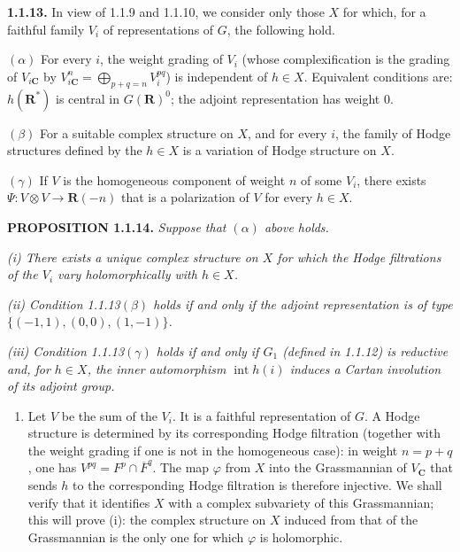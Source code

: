 \documentclass[10pt,a4paper]{article}
\providecommand{\tightlist}{\setlength{\itemsep}{0pt}\setlength{\parskip}{0pt}}
\begin{document}
\textbf{1.1.13.} In view of 1.1.9 and 1.1.10, we consider only those \(X\) for which, for a faithful family \(V_i\) of representations of \(G\), the following hold.

\((\alpha)\) For every \(i\), the weight grading of \(V_i\) (whose complexification is the grading of \(V_{i\mathbf C}\) by \(V_{i\mathbf C}^n=\bigoplus_{p+q=n}V_i^{pq}\)) is independent of \(h\in X\). Equivalent conditions are: \(h(\mathbf R^*)\) is central in \(G(\mathbf R)^0\); the adjoint representation has weight 0.

\((\beta)\) For a suitable complex structure on \(X\), and for every \(i\), the family of Hodge structures defined by the \(h\in X\) is a variation of Hodge structure on \(X\).

\((\gamma)\) If \(V\) is the homogeneous component of weight \(n\) of some \(V_i\), there exists \(\Psi:V\otimes V\to\mathbf R(-n)\) that is a polarization of \(V\) for every \(h\in X\).

\textbf{PROPOSITION 1.1.14.} \emph{Suppose that \((\alpha)\) above holds.}

\emph{(i) There exists a unique complex structure on \(X\) for which the Hodge filtrations of the \(V_i\) vary holomorphically with \(h\in X\).}

\emph{(ii) Condition 1.1.13\((\beta)\) holds if and only if the adjoint representation is of type \(\{(-1,1),(0,0),(1,-1)\}\).}

\emph{(iii) Condition 1.1.13\((\gamma)\) holds if and only if \(G_1\) (defined in 1.1.12) is reductive and, for \(h\in X\), the inner automorphism \(\operatorname{int}h(i)\) induces a Cartan involution of its adjoint group.}

\begin{enumerate}
\def\labelenumi{(\roman{enumi})}
\tightlist
\item
  Let \(V\) be the sum of the \(V_i\). It is a faithful representation of \(G\). A Hodge structure is determined by its corresponding Hodge filtration (together with the weight grading if one is not in the homogeneous case): in weight \(n=p+q\), one has \(V^{pq}=F^p\cap\overline F^q\). The map \(\varphi\) from \(X\) into the Grassmannian of \(V_{\mathbf C}\) that sends \(h\) to the corresponding Hodge filtration is therefore injective. We shall verify that it identifies \(X\) with a complex subvariety of this Grassmannian; this will prove (i): the complex structure on \(X\) induced from that of the Grassmannian is the only one for which \(\varphi\) is holomorphic.
\end{enumerate}
\end{document}

